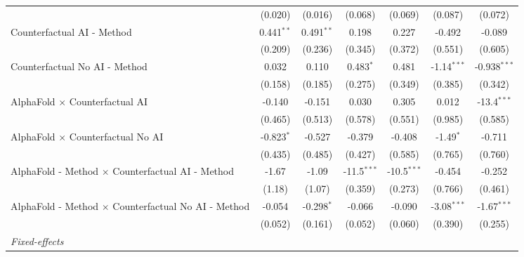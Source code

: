 \begin{tabular}{lcccccc}
                                                              & (0.020)      & (0.016)      & (0.068)       & (0.069)       & (0.087)       & (0.072)\\   
   Counterfactual AI - Method                                 & 0.441$^{**}$ & 0.491$^{**}$ & 0.198         & 0.227         & -0.492        & -0.089\\   
                                                              & (0.209)      & (0.236)      & (0.345)       & (0.372)       & (0.551)       & (0.605)\\   
   Counterfactual No AI - Method                              & 0.032        & 0.110        & 0.483$^{*}$   & 0.481         & -1.14$^{***}$ & -0.938$^{***}$\\   
                                                              & (0.158)      & (0.185)      & (0.275)       & (0.349)       & (0.385)       & (0.342)\\   
   AlphaFold $\times$ Counterfactual AI                       & -0.140       & -0.151       & 0.030         & 0.305         & 0.012         & -13.4$^{***}$\\   
                                                              & (0.465)      & (0.513)      & (0.578)       & (0.551)       & (0.985)       & (0.585)\\   
   AlphaFold $\times$ Counterfactual No AI                    & -0.823$^{*}$ & -0.527       & -0.379        & -0.408        & -1.49$^{*}$   & -0.711\\   
                                                              & (0.435)      & (0.485)      & (0.427)       & (0.585)       & (0.765)       & (0.760)\\   
   AlphaFold - Method $\times$ Counterfactual AI - Method     & -1.67        & -1.09        & -11.5$^{***}$ & -10.5$^{***}$ & -0.454        & -0.252\\   
                                                              & (1.18)       & (1.07)       & (0.359)       & (0.273)       & (0.766)       & (0.461)\\   
   AlphaFold - Method $\times$ Counterfactual No AI - Method  & -0.054       & -0.298$^{*}$ & -0.066        & -0.090        & -3.08$^{***}$ & -1.67$^{***}$\\   
                                                              & (0.052)      & (0.161)      & (0.052)       & (0.060)       & (0.390)       & (0.255)\\   
   \midrule
   \emph{Fixed-effects}\\

\end{tabular}
